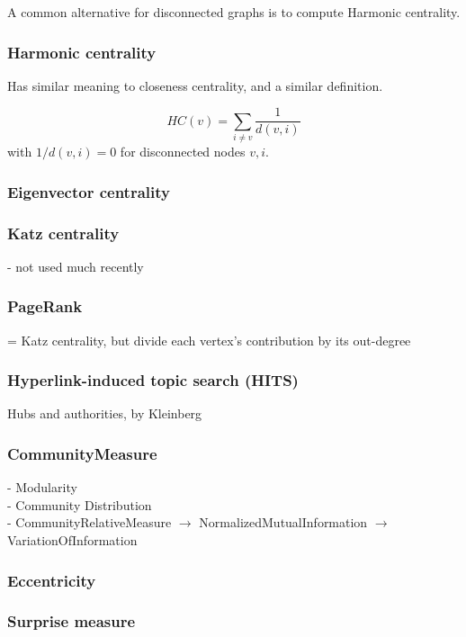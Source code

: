 A common alternative for disconnected graphs is to compute Harmonic centrality.

\subsubsection{Harmonic centrality}

Has similar meaning to closeness centrality, and a similar definition.

\[HC(v) = \sum_{i \neq v} \frac{1}{d(v, i)}\]
with $1 / d(v, i) = 0$ for disconnected nodes $v, i$.

\subsubsection{Eigenvector centrality}

\subsubsection{Katz centrality}
- not used much recently

\subsubsection{PageRank}
= Katz centrality, but divide each vertex's contribution by its out-degree

\subsubsection{Hyperlink-induced topic search (HITS)}
Hubs and authorities, by Kleinberg


\subsubsection{CommunityMeasure}
- Modularity\\
- Community Distribution\\
- CommunityRelativeMeasure $\rightarrow$ NormalizedMutualInformation $\rightarrow$ VariationOfInformation

\subsubsection{Eccentricity}

\subsubsection{Surprise measure}


